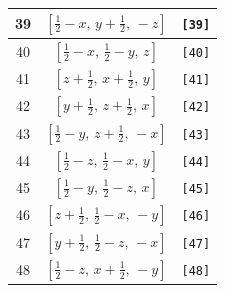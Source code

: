 \documentclass[fleqn,8pt]{jsarticle}
\begin{document}
\begin{longtable}{ccc}
39 & $\left[ \frac{1}{2} - x,\, y + \frac{1}{2},\, - z \right]$ & {\tt [39]} \\ \hline
40 & $\left[ \frac{1}{2} - x,\, \frac{1}{2} - y,\, z \right]$ & {\tt [40]} \\ \hline
41 & $\left[ z + \frac{1}{2},\, x + \frac{1}{2},\, y \right]$ & {\tt [41]} \\ \hline
42 & $\left[ y + \frac{1}{2},\, z + \frac{1}{2},\, x \right]$ & {\tt [42]} \\ \hline
43 & $\left[ \frac{1}{2} - y,\, z + \frac{1}{2},\, - x \right]$ & {\tt [43]} \\ \hline
44 & $\left[ \frac{1}{2} - z,\, \frac{1}{2} - x,\, y \right]$ & {\tt [44]} \\ \hline
45 & $\left[ \frac{1}{2} - y,\, \frac{1}{2} - z,\, x \right]$ & {\tt [45]} \\ \hline
46 & $\left[ z + \frac{1}{2},\, \frac{1}{2} - x,\, - y \right]$ & {\tt [46]} \\ \hline
47 & $\left[ y + \frac{1}{2},\, \frac{1}{2} - z,\, - x \right]$ & {\tt [47]} \\ \hline
48 & $\left[ \frac{1}{2} - z,\, x + \frac{1}{2},\, - y \right]$ & {\tt [48]} \\
\end{longtable}
\end{document}
